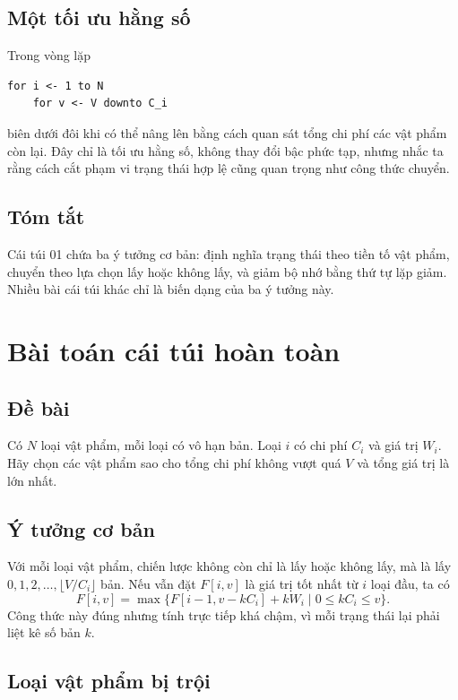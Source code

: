 \documentclass[11pt]{article}
\begin{document}
\subsection{Một tối ưu hằng số}

Trong vòng lặp
\begin{verbatim}
for i <- 1 to N
    for v <- V downto C_i
\end{verbatim}
biên dưới đôi khi có thể nâng lên bằng cách quan sát tổng chi phí các vật phẩm
còn lại. Đây chỉ là tối ưu hằng số, không thay đổi bậc phức tạp, nhưng nhắc ta
rằng cách cắt phạm vi trạng thái hợp lệ cũng quan trọng như công thức chuyển.

\subsection{Tóm tắt}

Cái túi 01 chứa ba ý tưởng cơ bản: định nghĩa trạng thái theo tiền tố vật
phẩm, chuyển theo lựa chọn lấy hoặc không lấy, và giảm bộ nhớ bằng thứ tự lặp
giảm. Nhiều bài cái túi khác chỉ là biến dạng của ba ý tưởng này.

\section{Bài toán cái túi hoàn toàn}

\subsection{Đề bài}

Có \(N\) loại vật phẩm, mỗi loại có vô hạn bản. Loại \(i\) có chi phí \(C_i\)
và giá trị \(W_i\). Hãy chọn các vật phẩm sao cho tổng chi phí không vượt quá
\(V\) và tổng giá trị là lớn nhất.

\subsection{Ý tưởng cơ bản}

Với mỗi loại vật phẩm, chiến lược không còn chỉ là lấy hoặc không lấy, mà là
lấy \(0,1,2,\ldots,\lfloor V/C_i\rfloor\) bản. Nếu vẫn đặt \(F[i,v]\) là giá
trị tốt nhất từ \(i\) loại đầu, ta có
\[
  F[i,v]=
  \max\{F[i-1,v-kC_i]+kW_i\mid 0\le kC_i\le v\}.
\]
Công thức này đúng nhưng tính trực tiếp khá chậm, vì mỗi trạng thái lại phải
liệt kê số bản \(k\).

\subsection{Loại vật phẩm bị trội}
\end{document}
